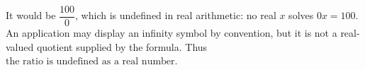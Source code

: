It would be $\dfrac{100}{0}$, which is undefined in real arithmetic: no real $x$ solves $0x=100$. An application may display an infinity symbol by convention, but it is not a real-valued quotient supplied by the formula. Thus $\boxed{\text{the ratio is undefined as a real number}}$.
